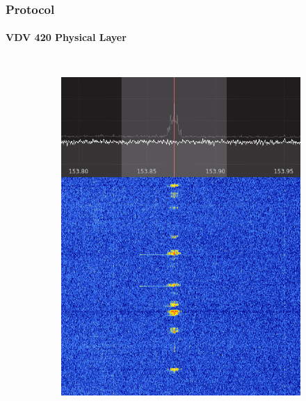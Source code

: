 
\begin{frame}
\frametitle{Protocol}
\framesubtitle{VDV 420 Physical Layer}
\begin{columns}
\centering
\begin{figure}
\centering
\begin{subfigure}[b]{0.46\textwidth}
	\centering
	\includegraphics[height=0.65\textheight,width=\textwidth]{figs/spectrum_chemnitz_cropped.png}
\end{subfigure}
\hfill
\begin{subfigure}[b]{0.46\textwidth}
	\centering

\end{subfigure}
\end{figure}
\end{columns}
\end{frame}
